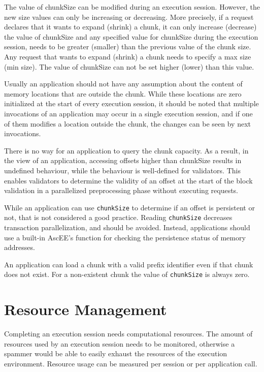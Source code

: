 The value of chunkSize can be modified during an execution session. However, the new size values can only be
increasing or decreasing. More precisely, if a request declares that it wants to expand (shrink) a chunk, it can only
increase (decrease) the value of chunkSize and any specified value for chunkSize during the execution session, needs
to be greater (smaller) than the previous value of the chunk size. Any request that wants to expand (shrink) a chunk
needs to specify a max size (min size). The value of chunkSize can not be set higher (lower) than this value.

Usually an application should not have any assumption about the content of memory locations that are outside the chunk.
While these locations are zero initialized at the start of every execution session, it should be noted that multiple
invocations of an application may occur in a single execution session, and if one of them modifies a location outside
the chunk, the changes can be seen by next invocations.

There is no way for an application to query the chunk capacity. As a result, in the view of an application, accessing
offsets higher than chunkSize results in undefined behaviour, while the behaviour is well-defined for validators.
This enables validators to determine the validity of an offset at the start of the block validation in a parallelized
preprocessing phase without executing requests.

While an application can use \texttt{chunkSize} to determine if an offset is persistent or not, that is not
considered a good practice. Reading \texttt{chunkSize} decreases transaction parallelization, and should be avoided.
Instead, applications should use a built-in AscEE's function for checking the persistence status of memory addresses.

An application can load a chunk with a valid prefix identifier even if that chunk does not exist. For a non-existent
chunk the value of \texttt{chunkSize} is always zero.


\section{Resource Management}\label{sec:res-man}

Completing an execution session needs computational resources. The amount of resources used by an execution session
needs to be monitored, otherwise a spammer would be able to easily exhaust the resources of the execution
environment. Resource usage can be measured per session or per application call.

